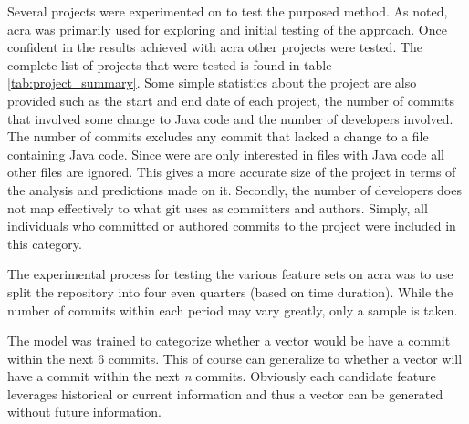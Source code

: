 Several projects were experimented on to test the purposed method. As noted, acra was primarily used for exploring and initial testing of the approach. Once confident in the results achieved with acra other projects were tested. The complete list of projects that were tested is found in table \ref{tab:project_summary}. Some simple statistics about the project are also provided such as the start and end date of each project, the number of commits that involved some change to Java code and the number of developers involved. The number of commits excludes any commit that lacked a change to a file containing Java code. Since were are only interested in files with Java code all other files are ignored. This gives a more accurate size of the project in terms of the analysis and predictions made on it. Secondly, the number of developers does not map effectively to what git uses as committers and authors. Simply, all individuals who committed or authored commits to the project were included in this category. 


The experimental process for testing the various feature sets on acra was to use split the repository into four even quarters (based on time duration). While the number of commits within each period may vary greatly, only a sample is taken.

The model was trained to categorize whether a vector would be have a commit within the next 6 commits. This of course can generalize to whether a vector will have a commit within the next \textit{n} commits. Obviously each candidate feature leverages historical or current information and thus a vector can be generated without future information.

